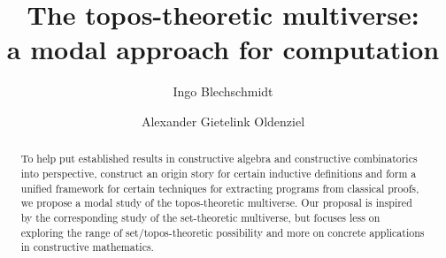 \documentclass[envcountsect,envcountsame,runningheads]{llncs}
\title{The topos-theoretic multiverse: \\ a modal approach for computation}
\newcommand{\xxx}[1]{}
\renewcommand{\_}{\mathpunct{.}\,}
\DeclareMathOperator{\necessary}{\text{\tikz[scale=.6ex/1cm,baseline=-.6ex,line width=.1ex]{\draw (-1,-1) rectangle (1,1);}}}
\newcommand{\?}{\,{:}\,}
\begin{document}
\author{Ingo Blechschmidt \and Alexander Gietelink Oldenziel}

\maketitle

\xxx{explain somewhere that just as $\neg\neg$ is visible constructively but not classically and that $\neg\neg$ enriches our understanding, so do the new modal operators. Especially in view of the fact that if LEM holds, then $\varphi \Leftrightarrow \necessary\varphi$ for bounded first-order formulas, as in the presence of LEM every topos is overt.}

\xxx{state (and ponder more) the example that every field has a separable closure somewhere}

\xxx{Alexander:
- it is not the case that for every topos E and every field k in E there is a separable closure k_s / k i don't think. what is a counterexample?
- it should be the case that for every (geometric field?)
-> it is positive (since it the etale topos of a field is Galois over the base so the pullback reflects isomorphisms I think: the pullback is a constant sheaf functor which sends a set to the trivial G-set on that set.)}

\begin{abstract}
  To help put established results in constructive algebra and constructive
  combinatorics into perspective, construct an origin story for certain
  inductive definitions and form a unified framework for certain techniques for
  extracting programs from classical proofs, we propose a modal study of the
  topos-theoretic multiverse. Our proposal is inspired by the corresponding study
  of the set-theoretic multiverse, but focuses less on exploring the range of
  set/topos-theoretic possibility and more on concrete applications in
  constructive mathematics.
\end{abstract}
\end{document}
